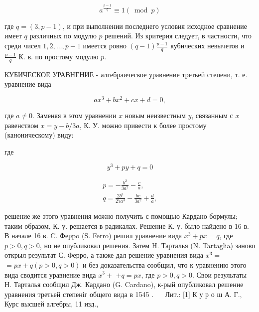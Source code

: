 \documentclass[10pt]{article}
\begin{document}
\[

a^{\frac{p-1}{q}} \equiv 1(\bmod p)

\]



где $q=(3, p-1)$, и при выполнении последнего условия исходное сравнение имеет $q$ различных по модулю $p$ решений. Из критерия следует, в частности, что среди чисел $1,2, \ldots, p-1$ имеется ровно $(q-1) \frac{p-1}{q}$ кубических невычетов и $\frac{p-1}{q}$ К. в. по простому модулю $p$.



КУБИЧЕСКОЕ УРАВНЕНИЕ - алгебраическое уравнение третьей степени, т. е. уравнение вида



\[

a x^{3}+b x^{2}+c x+d=0,

\]



где $a \neq 0$. Заменяя в этом уравнении $x$ новым неизвестным $y$, связанным с $x$ равенством $x=y-b / 3 a$, К. У. можно привести к более простому (каноническому) виду:



где



\[

y^{3}+p y+q=0

\]



\[

\begin{gathered}

p=-\frac{b^{2}}{3 a^{2}}-\frac{c}{a}, \\

q=\frac{2 b^{3}}{27 a^{3}}-\frac{b c}{3 a^{2}}+\frac{d}{a},

\end{gathered}

\]



решение же этого уравнения можно получить с помощью Кардано бормулы; таким образом, К. у. решается в радикалах. Решение К. у. было найдено в 16 в. В начале 16 в. C. Ферpo (S. Ferro) решил уравнение вида $x^{3}+p x=q$, где $p>0, q>0$, но не опубликовал решения. Затем H. Тарталья (N. Tartaglia) заново открыл результат С. Ферро, а также дал решение уравнения вида $x^{3}=$ $=p x+q(p>0, q>0)$ и без доказательства сообщил, что к уравнению этого вида сводится уравнение вида $x^{3}+$ $+q=p x$, где $p>0, q>0$. Свои результаты Н. Тарталья сообщил Дж. Кардано (G. Cardano), к-рый опубликовал решение уравнения третьей степеніг общего вида в 1545 . $\quad$ Лит.: [1] К у р о ш А. Г., Курс высшей алгебры, 11 изд.,
\end{document}
